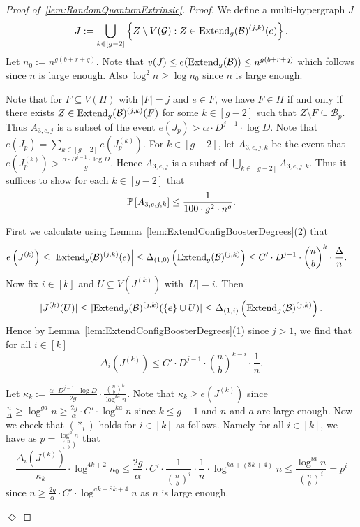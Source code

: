 \documentclass[11pt]{article}
\newcommand{\mc}[1]{\mathcal{#1}}
\newcounter{i}
\theoremstyle{plain}
\newenvironment{proofclaim}[1][]%
{\noindent \emph{Proof.} {}{#1}{}}{\hfill
	$\Diamond$\vspace{1em}}
\renewcommand{\theclaim}{\thetheorem.\arabic{claim}}
\newenvironment{lateproof}[1]
 {%
  \renewcommand{\theclaim}{\ref{#1}.\arabic{claim}}%
  \begin{proof}[Proof of~\cref{#1}]%
 }
 {\end{proof}}
\theoremstyle{plain} %
\theoremstyle{definition}
\newcommand{\Prob}[1]{\ensuremath{%
\mathbb P\left[#1\right]
}}
\begin{document}
\begin{lateproof}{lem:RandomQuantumExtrinsic}
\begin{proofclaim}
We define a multi-hypergraph $J$ 
$$J:= \bigcup_{k\in [g-2]} \left\{ Z\setminus V(\mc{G}): Z\in{\rm Extend}_g(\mc{B})^{(j,k)}(e)\right\}.$$
Let $n_0:= n^{g(b+r+q)}$. Note that $v(J) \le e({\rm Extend}_g(\mc{B})) \le n^{g(b+r+q)}$ which follows since $n$ is large enough. Also $\log^2 n\ge \log n_0$ since $n$ is large enough.

Note that for $F\subseteq V(H)$ with $|F|=j$ and $e\in F$, we have $F\in H$ if and only if there exists $Z\in{\rm Extend}_g(\mc{B})^{(j,k)}(F)$ for some $k\in [g-2]$ such that $Z\setminus F\subseteq \mc{B}_p$. Thus $A_{3,e,j}$ is a subset of the event $e(J_p) > \alpha \cdot D^{j-1}\cdot \log D$.
Note that $e(J_p) = \sum_{k\in [g-2]} e\left(J^{(k)}_p\right)$. For $k\in [g-2]$, let $A_{3,e,j,k}$ be the event that $e\left(J^{(k)}_p\right) > \frac{\alpha\cdot D^{i-1}\cdot \log D}{g}$. Hence $A_{3,e,j}$ is a subset of $\bigcup_{k \in [g-2]} A_{3,e,j,k}$. Thus it suffices to show for each  $k\in [g-2]$ that
$$\Prob{A_{3,e,j,k}} \le \frac{1}{100\cdot g^2 \cdot n^q}.$$

First we calculate using Lemma~\ref{lem:ExtendConfigBoosterDegrees}(2) that
\begin{align*}
e\left(J^{(k)}\right) &\le \left|{\rm Extend}_g(\mc{B})^{(j,k)}(e)\right|\le \Delta_{(1,0)}\left({\rm Extend}_g(\mc{B})^{(j,k)}\right) \le C'\cdot D^{j-1}\cdot \binom{n}{b}^{k}\cdot \frac{\Delta}{n}.
\end{align*}
Now fix $i\in [k]$ and $U\subseteq V(J^{(k)})$ with $|U|=i$. Then
$$|J^{(k)}(U)| \le |{\rm Extend}_g(\mc{B})^{(j,k)}(\{e\}\cup U)| \le \Delta_{(1,i)}\left({\rm Extend}_g(\mc{B})^{(j,k)}\right).$$
Hence by Lemma~\ref{lem:ExtendConfigBoosterDegrees}(1) since $j>1$, we find that for all $i\in [k]$
$$\Delta_i\left(J^{(k)}\right) \le C'\cdot D^{j-1}\cdot \binom{n}{b}^{k-i}\cdot \frac{1}{n}.$$

Let $\kappa_k:= \frac{\alpha\cdot D^{j-1}\cdot \log D}{2g} \cdot \frac{\binom{n}{b}^k}{\log^{ka} n}$. Note that $\kappa_k\ge e\left(J^{(k)}\right)$ since $\frac{n}{\Delta} \ge \log^{ga} n \ge \frac{2g}{\alpha}\cdot C'\cdot \log^{ka} n$ since $k\le g-1$ and $n$ and $a$ are large enough. Now we check that $(*_i)$ holds for $i\in [k]$ as follows. Namely for all $i\in [k]$, we have as $p=\frac{\log^a n}{\binom{n}{b}}$ that
$$\frac{\Delta_i\left(J^{(k)}\right)}{\kappa_k}\cdot \log^{4k+2}n_0\le \frac{2g}{\alpha}\cdot C'\cdot \frac{1}{\binom{n}{b}^i}\cdot \frac{1}{n} \cdot \log^{ka+(8k+4)}n \le \frac{\log^{ia} n}{\binom{n}{b}^i} = p^i$$ since $n \ge \frac{2g}{\alpha}\cdot C'\cdot \log^{ak+8k+4} n$ as $n$ is large enough. 


\end{proofclaim}
\end{lateproof}
\end{document}
